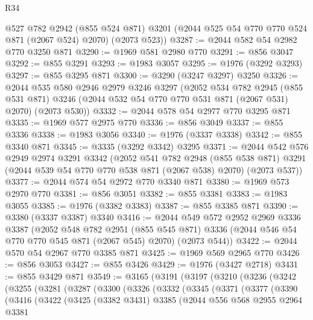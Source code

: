 \begin{lexlean}{R34}
\begin{coremodule}
      @527
      @782
      @2942
      (@855 @524 @871)
      @3201
      (@2044 @525 @54 @770 @770 @524 @871 (@2067 @524) @2070)
      (@2073 @523))
@3287 := @2044 @582 @54 @2982 @770 @3250 @871
@3290 := @1969 @581 @2980 @770
@3291 := @856 @3047
@3292 := @855 @3291
@3293 := @1983 @3057
@3295 := @1976 (@3292 @3293)
@3297 := @855 @3295 @871
@3300 := @3290 (@3247 @3297) @3250
@3326 := @2044
    @535
    @580
    @2946
    @2979
    @3246
    @3297
    (@2052
      @534
      @782
      @2945
      (@855 @531 @871)
      @3246
      (@2044 @532 @54 @770 @770 @531 @871 (@2067 @531) @2070)
      (@2073 @530))
@3332 := @2044 @578 @54 @2977 @770 @3295 @871
@3335 := @1969 @577 @2975 @770
@3336 := @856 @3049
@3337 := @855 @3336
@3338 := @1983 @3056
@3340 := @1976 (@3337 @3338)
@3342 := @855 @3340 @871
@3345 := @3335 (@3292 @3342) @3295
@3371 := @2044
    @542
    @576
    @2949
    @2974
    @3291
    @3342
    (@2052
      @541
      @782
      @2948
      (@855 @538 @871)
      @3291
      (@2044 @539 @54 @770 @770 @538 @871 (@2067 @538) @2070)
      (@2073 @537))
@3377 := @2044 @574 @54 @2972 @770 @3340 @871
@3380 := @1969 @573 @2970 @770
@3381 := @856 @3051
@3382 := @855 @3381
@3383 := @1983 @3055
@3385 := @1976 (@3382 @3383)
@3387 := @855 @3385 @871
@3390 := @3380 (@3337 @3387) @3340
@3416 := @2044
    @549
    @572
    @2952
    @2969
    @3336
    @3387
    (@2052
      @548
      @782
      @2951
      (@855 @545 @871)
      @3336
      (@2044 @546 @54 @770 @770 @545 @871 (@2067 @545) @2070)
      (@2073 @544))
@3422 := @2044 @570 @54 @2967 @770 @3385 @871
@3425 := @1969 @569 @2965 @770
@3426 := @856 @3053
@3427 := @855 @3426
@3429 := @1976 (@3427 @2718)
@3431 := @855 @3429 @871
@3549 := @3165
    (@3191
      (@3197
        (@3210
          (@3236
            (@3242
              (@3255
                (@3281
                  (@3287
                    (@3300
                      (@3326
                        (@3332
                          (@3345
                            (@3371
                              (@3377
                                (@3390
                                  (@3416
                                    (@3422
                                      (@3425
                                        (@3382 @3431)
                                        @3385
                                        (@2044
                                          @556
                                          @568
                                          @2955
                                          @2964
                                          @3381

\end{coremodule}
\end{lexlean}

